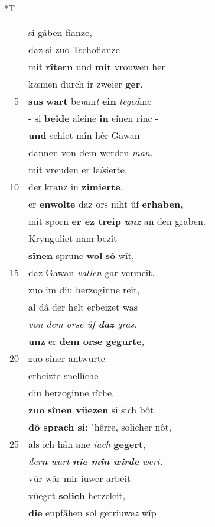 \documentclass[8pt,a4paper,notitlepage]{article}
\begin{document}
\begin{table}[ht]
\begin{minipage}[t]{0.5\linewidth}
\small
\begin{center}*T
\end{center}
\begin{tabular}{rl}
 & si gâben fîanze,\\ 
 & daz si zuo Tschoflanze\\ 
 & mit \textbf{rîtern} und \textbf{mit} vrouwen her\\ 
 & k\textit{œ}men durch ir zweier \textbf{ger}.\\ 
5 & \textbf{sus} \textbf{wart} be\textit{n}an\textit{t} \textbf{ein} \textit{teged}inc\\ 
 & - si \textbf{beide} aleine \textbf{in} einen rinc -\\ 
 & \textbf{und} schiet mîn hêr Gawan\\ 
 & dannen von dem werden \textit{man}.\\ 
 & mit vreuden er le\textit{i}sierte,\\ 
10 & der kranz in \textbf{zimierte}.\\ 
 & er \textbf{en}\textbf{wolte} daz ors niht ûf \textbf{erhaben},\\ 
 & mit sporn \textbf{er ez treip} \textit{\textbf{unz}} an den graben.\\ 
 & Krynguliet nam bezît\\ 
 & \textbf{sînen} sprunc \textbf{wol} \textbf{sô} wît,\\ 
15 & daz Gawan \textit{vallen} gar vermeit.\\ 
 & zuo im diu herzoginne reit,\\ 
 & al dâ der helt erbeizet was\\ 
 & \textit{von dem orse ûf \textbf{daz} gras}.\\ 
 & \textbf{unz} er \textbf{dem orse gegurte},\\ 
20 & zuo sîner antwurte\\ 
 & erbeizte snellîche\\ 
 & diu herzoginne rîche.\\ 
 & \textbf{zuo} \textbf{sînen vüezen} si sich bôt.\\ 
 & \textbf{dô sprach si}: "hêrre, solicher nôt,\\ 
25 & als ich hân ane \textit{iuch} \textbf{gegert},\\ 
 & \textit{der\textbf{n} wart \textbf{nie mîn wirde} wert}.\\ 
 & vür wâr mir iuwer arbeit\\ 
 & vüeget \textbf{solich} herzeleit,\\ 
 & \textbf{die} enpfâhen sol getriuwe\textit{z} wîp\\ 

\end{tabular}
\end{minipage}
\end{table}
\end{document}
